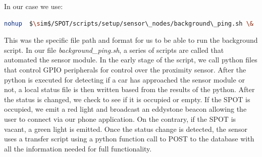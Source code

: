 In our case we use:
\begin{lstlisting}[language=bash]
nohup  $\sim$/SPOT/scripts/setup/sensor\_nodes/background\_ping.sh \&
\end{lstlisting}

This was the specific file path and format for us to be able to run the background script.
In our file \textit{background\_ping.sh}, a series of scripts are called that automated the sensor module.
In the early stage of the script, we call python files that control GPIO peripherals for control over the proximity sensor.
After the python is executed for detecting if a car has approached the sensor module or not, a local status file is then written based from the results of the python. 
After the status is changed, we check to see if it is occupied or empty.
If the SPOT is occupied, we emit a red light and broadcast an eddystone beacon allowing the user to connect via our phone application. 
On the contrary, if the SPOT is vacant, a green light is emitted.
Once the status change is detected, the sensor uses a transfer script using a python function call to POST to the database with all the information needed for full functionality.

